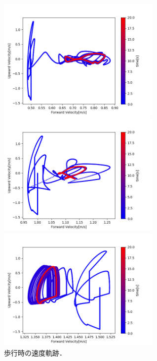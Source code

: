 \begin{figure} %
 \begin{minipage}[b]{.5\linewidth}
  \centering
  \includegraphics[clip,width = 8cm]{./fig/Velocity_dx0_5walk.png}
 \end{minipage}
 \begin{minipage}[b]{.5\linewidth}
  \centering
  \includegraphics[clip,width = 8cm]{./fig/Velocity_dx1walk.png}
 \end{minipage}
 \caption{歩行時の速度軌跡．\label{wtrj}}
 \begin{minipage}[b]{.5\linewidth}
  \centering
  \includegraphics[clip,width = 8cm]{./fig/Velocity_dx1_5run.png}

\end{minipage}
\end{figure}
